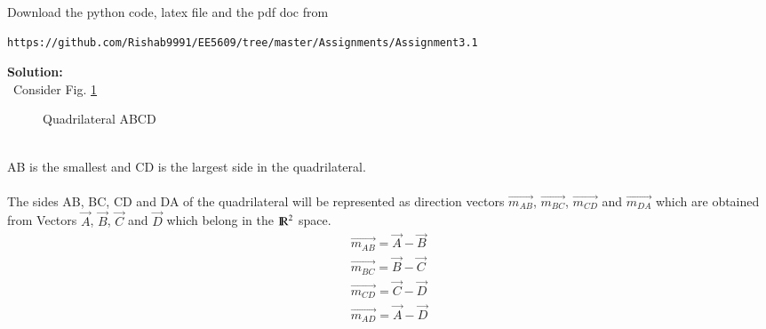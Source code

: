 \documentclass[journal,12pt,twocolumn]{IEEEtran}
\begin{document}
%
Download the python code, latex file and the pdf doc from 
\begin{lstlisting}
https://github.com/Rishab9991/EE5609/tree/master/Assignments/Assignment3.1
\end{lstlisting}
\textbf{Solution:}
\\\ Consider Fig. \ref{Fig:1}
\begin{figure}[!ht]
    \centering
     \caption{Quadrilateral ABCD}
     \label{Fig:1}
\end{figure}
\\
AB is the smallest and CD is the largest side in the quadrilateral.\\\\
The sides AB, BC, CD and DA of the quadrilateral will be represented as direction vectors $\vec{m_{AB}}$, $\vec{m_{BC}}$, $\vec{m_{CD}}$ and $\vec{m_{DA}}$ which are obtained from Vectors $\vec{A}$, $\vec{B}$, $\vec{C}$ and $\vec{D}$ which belong in the ${\rm I\!R}^2$ space. 
\begin{align}
   \vec{m_{AB}} = \vec{A} - \vec{B}\\ 
   \vec{m_{BC}} = \vec{B} - \vec{C}\\
   \vec{m_{CD}} = \vec{C} - \vec{D}\\
   \vec{m_{AD}} = \vec{A} - \vec{D}
\end{align}\\
\end{document}
